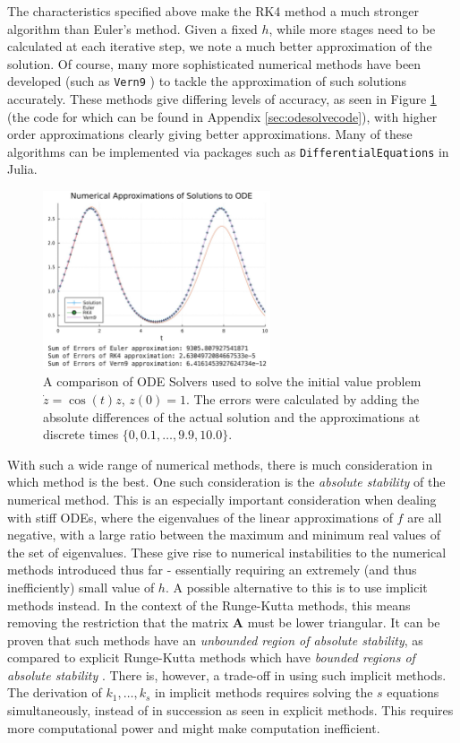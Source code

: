 \documentclass[a4paper,11pt,titlepage]{article}
\theoremstyle{definition}
\theoremstyle{plain}
\theoremstyle{remark}
\begin{document}
The characteristics specified above make the RK4 method a much stronger algorithm than Euler's method. Given a fixed $h$, while more stages need to be calculated at each iterative step, we note a much better approximation of the solution. Of course, many more sophisticated numerical methods have been developed (such as \texttt{Vern9} \cite{verner2010}) to tackle the approximation of such solutions accurately. These methods give differing levels of accuracy, as seen in Figure \ref{fig:odesolver} (the code for which can be found in Appendix \ref{sec:odesolvecode}), with higher order approximations clearly giving better approximations. Many of these algorithms can be implemented via packages such as \texttt{DifferentialEquations} in Julia.

\begin{figure}
    \centering
    \includegraphics[width=0.6\textwidth]{report/figures/ODESolvers.png}
    \caption{A comparison of ODE Solvers used to solve the initial value problem $\dot{z} = \cos(t)z$, $z(0) = 1$. The errors were calculated by adding the absolute differences of the actual solution and the approximations at discrete times $\{0, 0.1, \dots, 9.9, 10.0\}$.}
    \label{fig:odesolver}
\end{figure}

With such a wide range of numerical methods, there is much consideration in which method is the best. One such consideration is the \textit{absolute stability} of the numerical method. This is an especially important consideration when dealing with stiff ODEs, where the eigenvalues of the linear approximations of $f$ are all negative, with a large ratio between the maximum and minimum real values of the set of eigenvalues. These give rise to numerical instabilities to the numerical methods introduced thus far - essentially requiring an extremely (and thus inefficiently) small value of $h$. A possible alternative to this is to use implicit methods instead. In the context of the Runge-Kutta methods, this means removing the restriction that the matrix $\mathbf{A}$ must be lower triangular. It can be proven that such methods have an \textit{unbounded region of absolute stability}, as compared to explicit Runge-Kutta methods which have \textit{bounded regions of absolute stability} \cite{sulimayers2003}. There is, however, a trade-off in using such implicit methods. The derivation of $k_1, \dots, k_s$ in implicit methods requires solving the $s$ equations simultaneously, instead of in succession as seen in explicit methods. This requires more computational power and might make computation inefficient.
\end{document}
